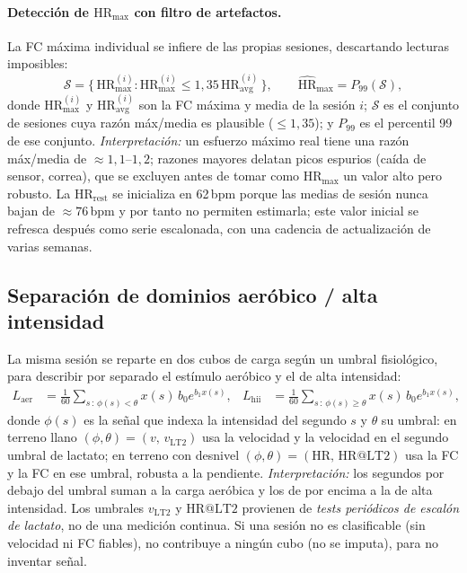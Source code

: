 \documentclass[11pt,a4paper]{article}
\begin{document}
\paragraph{Detección de $\mathrm{HR}_{\max}$ con filtro de artefactos.} La FC máxima individual se infiere de las propias sesiones, descartando lecturas imposibles:
\begin{equation}
\mathcal{S} = \{\,\mathrm{HR}_{\max}^{(i)} : \mathrm{HR}_{\max}^{(i)} \le 1{,}35\,\mathrm{HR}_{\mathrm{avg}}^{(i)}\,\},
\qquad
\widehat{\mathrm{HR}}_{\max} = P_{99}(\mathcal{S}),
\label{eq:hrmax}
\end{equation}
donde $\mathrm{HR}_{\max}^{(i)}$ y $\mathrm{HR}_{\mathrm{avg}}^{(i)}$ son la FC máxima y media de la sesión $i$; $\mathcal{S}$ es el conjunto de sesiones cuya razón máx/media es plausible ($\le1{,}35$); y $P_{99}$ es el percentil 99 de ese conjunto. \textit{Interpretación:} un esfuerzo máximo real tiene una razón máx/media de $\approx1{,}1$--$1{,}2$; razones mayores delatan picos espurios (caída de sensor, correa), que se excluyen antes de tomar como $\mathrm{HR}_{\max}$ un valor alto pero robusto. La $\mathrm{HR}_{\mathrm{rest}}$ se inicializa en 62\,bpm porque las medias de sesión nunca bajan de $\approx76$\,bpm y por tanto no permiten estimarla; este valor inicial se refresca después como serie escalonada, con una cadencia de actualización de varias semanas.

\subsection{Separación de dominios aeróbico / alta intensidad}
\label{sec:domains}
La misma sesión se reparte en dos cubos de carga según un umbral fisiológico, para describir por separado el estímulo aeróbico y el de alta intensidad:
\begin{align}
L_{\mathrm{aer}} &= \frac{1}{60}\sum_{s\,:\,\phi(s) < \theta} x(s)\, b_0 e^{b_1 x(s)},
&
L_{\mathrm{hii}} &= \frac{1}{60}\sum_{s\,:\,\phi(s) \ge \theta} x(s)\, b_0 e^{b_1 x(s)},
\label{eq:domains}
\end{align}
donde $\phi(s)$ es la señal que indexa la intensidad del segundo $s$ y $\theta$ su umbral: en terreno llano $(\phi,\theta)=(v,\,v_{\mathrm{LT2}})$ usa la velocidad y la velocidad en el segundo umbral de lactato; en terreno con desnivel $(\phi,\theta)=(\mathrm{HR},\,\mathrm{HR@LT2})$ usa la FC y la FC en ese umbral, robusta a la pendiente. \textit{Interpretación:} los segundos por debajo del umbral suman a la carga aeróbica y los de por encima a la de alta intensidad. Los umbrales $v_{\mathrm{LT2}}$ y $\mathrm{HR@LT2}$ provienen de \emph{tests periódicos de escalón de lactato}, no de una medición continua. Si una sesión no es clasificable (sin velocidad ni FC fiables), no contribuye a ningún cubo (no se imputa), para no inventar señal.
\end{document}
